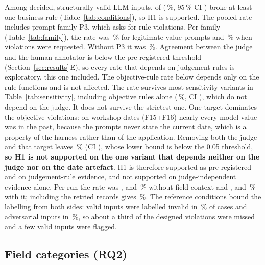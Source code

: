 \documentclass[conference]{IEEEtran}
\begin{document}
Among decided, structurally valid LLM inputs,  of  (\,\%, 95\,\% CI
) broke at least one business rule (Table~\ref{tab:conditions}), so H1 is supported. The
pooled rate includes prompt family P3, which asks for rule violations. Per family
(Table~\ref{tab:family}), the rate was \,\% for legitimate-value prompts and
\,\% when violations were requested. Without P3 it was \,\%.
\ifjudgeweak Agreement between the judge and the human annotator is below the pre-registered threshold
(Section~\ref{sec:results}\,E), so every rate that depends on judgement rules is exploratory, this one
included. The objective-rule rate below depends only on the rule functions and is not affected.\fi{}
The rate survives most sensitivity variants in Table~\ref{tab:sensitivity}, including objective rules
alone (\,\%, CI ), which do not depend on the judge. It does
not survive the strictest one. One target dominates the objective violations: on workshop dates
(F15+F16) nearly every model value was in the past, because the prompts never state the current date,
which is a property of the harness rather than of the application. Removing both the judge and that
target leaves \,\% (CI ), whose lower bound is below the
0.05 threshold, \textbf{so H1 is not supported on the one variant that depends neither on the judge
nor on the date artefact}. H1 is therefore supported as pre-registered and on judgement-rule evidence,
and not supported on judge-independent evidence alone. Per
run the rate was ,  and \,\% without field context and ,
 and \,\% with it; including the retried records gives
\,\%. The reference conditions bound the labelling from both sides: valid inputs
were labelled invalid in \,\% of cases and adversarial inputs in \,\%, so
about a third of the designed violations were missed and a few valid inputs were flagged.


\subsection{Field categories (RQ2)}
\end{document}
